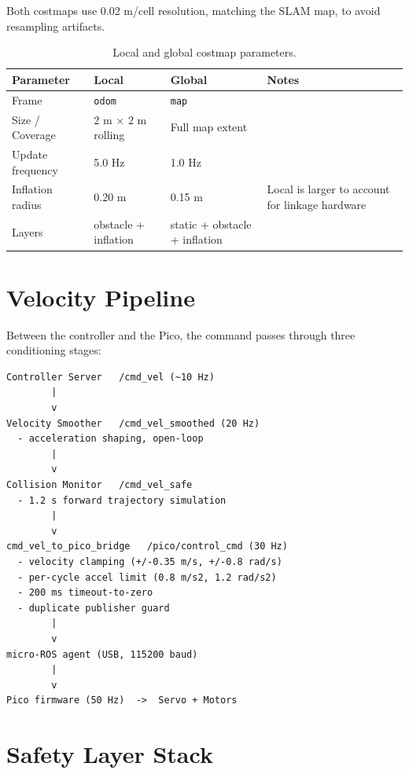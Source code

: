 \documentclass[12pt,a4paper]{report}
\begin{document}
Both costmaps use 0.02 m/cell resolution, matching the SLAM map, to avoid resampling artifacts.

\begin{table}[H]
\centering
\caption{Local and global costmap parameters.}
\label{tab:costmaps}
\begin{tabularx}{\textwidth}{|p{3.5cm}|p{2.2cm}|p{2.2cm}|X|}
\hline
\textbf{Parameter} & \textbf{Local} & \textbf{Global} & \textbf{Notes} \\
\hline
Frame & \texttt{odom} & \texttt{map} & \\
\hline
Size / Coverage & 2 m $\times$ 2 m rolling & Full map extent & \\
\hline
Update frequency & 5.0 Hz & 1.0 Hz & \\
\hline
Inflation radius & 0.20 m & 0.15 m & Local is larger to account for linkage hardware \\
\hline
Layers & obstacle + inflation & static + obstacle + inflation & \\
\hline
\end{tabularx}
\end{table}

\section{Velocity Pipeline}

Between the controller and the Pico, the command passes through three conditioning stages:

\begin{lstlisting}
Controller Server   /cmd_vel (~10 Hz)
        |
        v
Velocity Smoother   /cmd_vel_smoothed (20 Hz)
  - acceleration shaping, open-loop
        |
        v
Collision Monitor   /cmd_vel_safe
  - 1.2 s forward trajectory simulation
        |
        v
cmd_vel_to_pico_bridge   /pico/control_cmd (30 Hz)
  - velocity clamping (+/-0.35 m/s, +/-0.8 rad/s)
  - per-cycle accel limit (0.8 m/s2, 1.2 rad/s2)
  - 200 ms timeout-to-zero
  - duplicate publisher guard
        |
        v
micro-ROS agent (USB, 115200 baud)
        |
        v
Pico firmware (50 Hz)  ->  Servo + Motors
\end{lstlisting}

\section{Safety Layer Stack}
\end{document}
